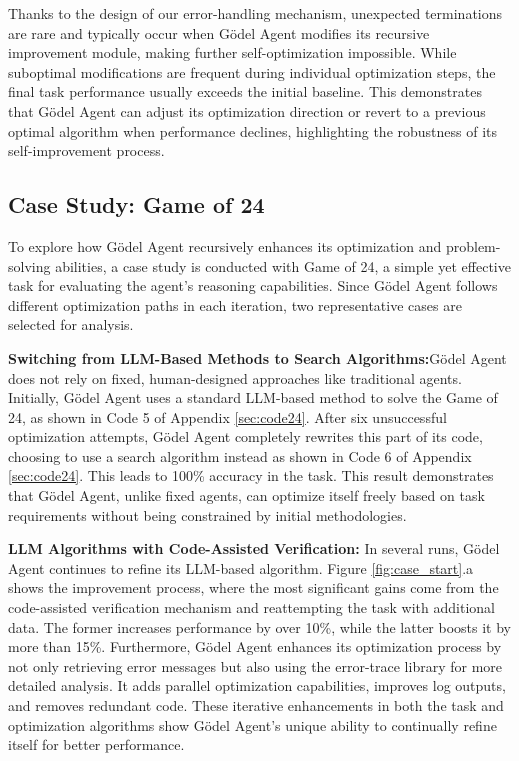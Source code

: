 \documentclass[11pt]{article}
\newcommand{\framework}{Gödel Agent\xspace}
\begin{document}
Thanks to the design of our error-handling mechanism, unexpected terminations are rare and typically occur when \framework modifies its recursive improvement module, making further self-optimization impossible. While suboptimal modifications are frequent during individual optimization steps, the final task performance usually exceeds the initial baseline. This demonstrates that \framework can adjust its optimization direction or revert to a previous optimal algorithm when performance declines, highlighting the robustness of its self-improvement process.



\subsection{Case Study: Game of 24}
\label{sec:game24}
To explore how \framework recursively enhances its optimization and problem-solving abilities, a case study is conducted with Game of 24, a simple yet effective task for evaluating the agent’s reasoning capabilities. Since \framework follows different optimization paths in each iteration, two representative cases are selected for analysis.



\noindent\textbf{Switching from LLM-Based Methods to Search Algorithms:}\quad \framework does not rely on fixed, human-designed approaches like traditional agents. Initially, \framework uses a standard LLM-based method to solve the Game of 24, as shown in Code 5 of Appendix \ref{sec:code24}. After six unsuccessful optimization attempts, \framework completely rewrites this part of its code, choosing to use a search algorithm instead as shown in Code 6 of Appendix \ref{sec:code24}. This leads to 100\% accuracy in the task. This result demonstrates that \framework, unlike fixed agents, can optimize itself freely based on task requirements without being constrained by initial methodologies.

\noindent\textbf{LLM Algorithms with Code-Assisted Verification:} \quad
In several runs, \framework continues to refine its LLM-based algorithm. Figure \ref{fig:case_start}.a shows the improvement process, where the most significant gains come from the code-assisted verification mechanism and reattempting the task with additional data. The former increases performance by over 10\%, while the latter boosts it by more than 15\%. Furthermore, \framework enhances its optimization process by not only retrieving error messages but also using the error-trace library for more detailed analysis. It adds parallel optimization capabilities, improves log outputs, and removes redundant code. These iterative enhancements in both the task and optimization algorithms show \framework{}’s unique ability to continually refine itself for better performance.
\end{document}
